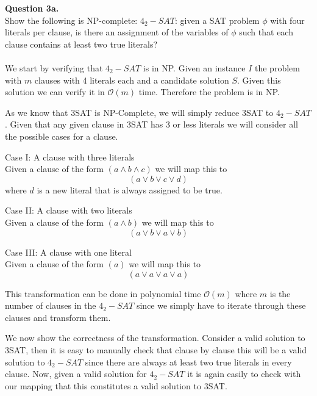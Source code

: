\documentclass{article}
\newcommand{\bigo}[1]{\mathcal{O}(#1)}
\newenvironment{question}[2]
{
    {\large \textbf{Question #1.}}\\
    #2\\\\
}{\newpage}
\begin{document}
\begin{question}
    {3a}
    {Show the following is NP-complete: $4_2-SAT$: given a SAT problem $\phi$ with four literals per clause, is
        there an assignment of the variables of $\phi$ such that each clause contains at
        least two true literals?}

    We start by verifying that $4_2-SAT$ is in NP. Given an instance $I$ the problem with $m$ clauses with 4 literals each  and a candidate solution $S$.
    Given this solution we can verify it in $\bigo{m}$ time. Therefore the problem is in NP.

    As we know that 3SAT is NP-Complete, we will simply reduce 3SAT to $4_2-SAT$. Given that any given clause in 3SAT has 3 or less literals we will
    consider all the possible cases for a clause.

    Case I: A clause with three literals\\
    Given a clause of the form $(a \wedge b \wedge c)$ we will map this to
    $$(a \vee b \vee c \vee d)$$
    where $d$ is a new literal that is always assigned to be true.

    Case II: A clause with two literals\\
    Given a clause of the form $(a \wedge b)$ we will map this to
    $$(a \vee b \vee a \vee b)$$

    Case III: A clause with one literal\\
    Given a clause of the form $(a)$ we will map this to
    $$(a \vee a \vee a \vee a)$$

    This transformation can be done in polynomial time $\bigo{m}$ where $m$ is the number of clauses in the $4_2-SAT$ since we simply have to iterate
    through these clauses and transform them.

    We now show the correctness of the transformation. Consider a valid solution to 3SAT, then it is easy to manually check that clause by clause this
    will be a valid solution to $4_2-SAT$ since there are always at least two true literals in every clause. Now, given a valid solution for $4_2-SAT$
    it is again easily to check with our mapping that this constitutes a valid solution to 3SAT.
\end{question}
\end{document}
